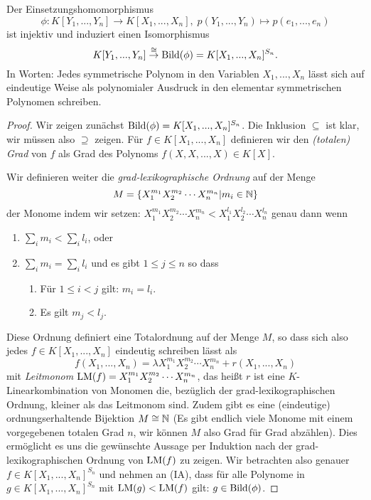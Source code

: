 \documentclass{book}
\begin{document}
\begin{thm}
    \label{thm:elsym}
    Der Einsetzungshomomorphismus 
    \[
        \phi: K[Y_1, ..., Y_n] \to K[X_1, ..., X_n],\; p(Y_1, ..., Y_n) \mapsto p(e_1, ..., e_n)
    \]
    ist injektiv und induziert einen Isomorphismus
    \[
        K[Y_1, ..., Y_n] \overset{\cong}{\to} \Bild(\phi) = K[X_1, ..., X_n]^{S_n}.
    \]
    In Worten: Jedes symmetrische Polynom in den Variablen $X_1, ..., X_n$
    lässt sich auf eindeutige Weise als polynomialer Ausdruck in den elementar
    symmetrischen Polynomen schreiben. 
\end{thm}
\begin{proof}
    Wir zeigen zunächst $\Bild(\phi) = K[X_1, ..., X_n]^{S_n}$. Die Inklusion $\subseteq$ ist klar, wir müssen also $\supseteq$ zeigen.
    Für $f \in K[X_1, ..., X_n]$ definieren wir den \emph{(totalen) Grad} von $f$ als Grad des
    Polynoms $f(X,X,...,X) \in K[X]$.

    Wir definieren weiter die \emph{grad-lexikographische Ordnung} auf der Menge 
    \[
        M = \{ X_1^{m_1}X_2^{m_2} \cdots X_n^{m_n} | m_i \in \mathbb{N} \}
    \]
    der Monome indem wir setzen: $X_1^{m_1}X_2^{m_2} \cdots X_n^{m_n} < X_1^{l_1}X_2^{l_2} \cdots X_n^{l_n}$ genau dann wenn 
    \begin{enumerate}[label=(\alph*)]
        \item $\sum_i m_i < \sum_i l_i$, oder
        \item $\sum_i m_i = \sum_i l_i$ und es gibt $1 \le j \le n$ so dass
    \begin{enumerate}
        \item Für $1 \le i < j$ gilt: $m_i = l_i$.
        \item Es gilt $m_j < l_j$. 
    \end{enumerate}
    \end{enumerate}
    Diese Ordnung definiert eine Totalordnung auf der Menge $M$, so dass sich
    also jedes $f \in K[X_1, ..., X_n]$ eindeutig schreiben lässt als
    \[
        f(X_1, ..., X_n) = \lambda X_1^{m_1}X_2^{m_2} \cdots X_n^{m_n} + r(X_1, ..., X_n)
    \]
    mit \emph{Leitmonom} $\operatorname{LM}(f) = X_1^{m_1}X_2^{m_2} \cdots X_n^{m_n}$, das heißt $r$
    ist eine $K$-Linearkombination von Monomen die, bezüglich der
    grad-lexikographischen Ordnung, kleiner als das Leitmonom  sind. Zudem gibt
    es eine (eindeutige) ordnungserhaltende Bijektion $M \cong \mathbb{N}$ (Es gibt
    endlich viele Monome mit einem vorgegebenen totalen Grad $n$, wir können
    $M$ also Grad für Grad abzählen). Dies ermöglicht es uns die gewünschte
    Aussage per Induktion nach der grad-lexikographischen Ordnung von $\operatorname{LM}(f)$
    zu zeigen. Wir betrachten also genauer $f \in K[X_1, ..., X_n]^{S_n}$ und
    nehmen an (IA), dass für alle Polynome in $g \in K[X_1, ..., X_n]^{S_n}$
    mit $\operatorname{LM}(g) < \operatorname{LM}(f)$ gilt: $g \in \Bild(\phi)$. 


\end{proof}
\end{document}
